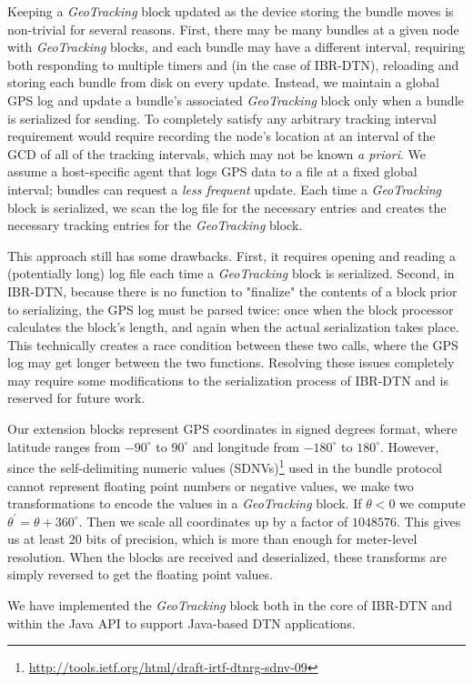 Keeping a {\em GeoTracking} block updated as the device storing the bundle moves is non-trivial for several reasons. First, there may be many bundles at a given node with {\em GeoTracking} blocks, and each bundle may have a different interval, requiring both responding to multiple timers and (in the case of IBR-DTN), reloading and storing each bundle from disk on every update. Instead, we maintain a global GPS log and update a bundle's associated {\em GeoTracking} block only when a bundle is serialized for sending. 
To completely satisfy any arbitrary tracking interval requirement would require recording the node's location at an interval of the GCD of all of the tracking intervals, which may not be known {\em a priori}. We assume a host-specific agent that logs GPS data to a file at a fixed global interval; bundles can request a {\em less frequent} update. Each time a {\em GeoTracking} block is serialized, we scan the log file for the necessary entries and creates the necessary tracking entries for the {\em GeoTracking} block.

This approach still has some drawbacks.  First, it requires opening and reading a (potentially long) log file each time a {\em GeoTracking} block is serialized.  Second, in IBR-DTN, because there is no function to "finalize" the contents of a block prior to serializing, the GPS log must be parsed twice: once when the block processor calculates the block's length, and again when the actual serialization takes place.  
This technically creates a race condition between these two calls, where the GPS log may get longer between the two functions.  Resolving these issues completely may require some modifications to the serialization process of IBR-DTN and is reserved for future work.

Our extension blocks represent GPS coordinates in signed degrees format, where latitude ranges from $-90^{\circ}$ to $90^{\circ}$ and longitude from $-180^{\circ}$ to $180^{\circ}$.  However, since the self-delimiting numeric values (SDNVs)\footnote{\scriptsize\url{http://tools.ietf.org/html/draft-irtf-dtnrg-sdnv-09}} used in the bundle protocol cannot represent floating point numbers or negative values, we make two transformations to encode the values in a {\em GeoTracking} block.  If $\theta<0$ we compute $\theta^{\prime}=\theta+360^{\circ}$.  Then we scale all coordinates up by a factor of $1048576$.  This gives us at least 20 bits of precision, which is more than enough for meter-level resolution.  When the blocks are received and deserialized, these transforms are simply reversed to get the floating point values.

We have implemented the {\em GeoTracking} block both in the core of IBR-DTN and within the Java API to support Java-based DTN applications.



